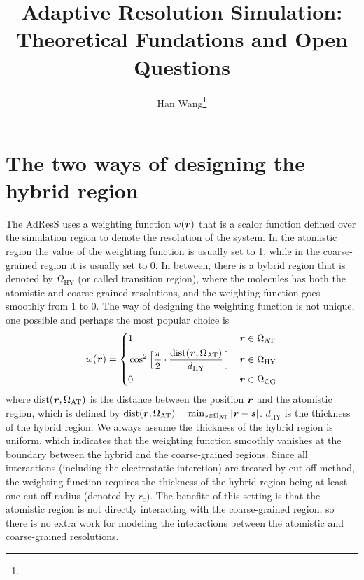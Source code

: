 \documentclass[epjST]{svjour}
\newcommand{\vect}[1]{\textbf{\textit{#1}}}
\newcommand{\dist}[0]{\textrm {dist}}
\newcommand{\AT}[0]{\textrm{AT}}
\newcommand{\HY}[0]{\textrm{HY}}
\newcommand{\CG}[0]{\textrm{CG}}
\begin{document}
%
\title{Adaptive Resolution Simulation: Theoretical Fundations and Open Questions}
\author{Han Wang\fnmsep\thanks{}}
%
%
%
\maketitle
%


\section{The two ways  of designing the hybrid region}

The AdResS uses a weighting function $w(\vect r)$ that is a scalor
function defined over the simulation region to denote the resolution
of the system. In the atomistic region the value of the
weighting function is usually set to 1, while in the coarse-grained
region it is usually set to 0. In between, there is a bybrid region
that is denoted by $\Omega_\HY$
(or called transition region), where the molecules
has both the atomistic and coarse-grained resolutions, and the weighting function
goes smoothly from 1 to 0. The way of designing the weighting function
is not unique, one possible and perhaps the most popular choice is
\begin{equation}\label{eqn:old-w}
  w(\vect r) =
  \left\{
    \begin{alignedat}{3}
      &1 &\quad& \vect r \in \Omega_\AT\\
      &\cos^2\Big[\frac{\pi}{2 } \cdot \frac{\dist(\vect r, \Omega_\AT)}{d_\HY}\,\Big] && \vect r \in\Omega_\HY \\
      &0 &    & \vect r \in \Omega_\CG 
    \end{alignedat}
  \right.
\end{equation}
where $\dist(\vect r, \Omega_\AT)$ is the distance between the
position $\vect r$ and the atomistic region, which is defined
by $\dist(\vect r, \Omega_\AT) = \min_{\vect s\in\Omega_\AT} \vert
\vect r - \vect s \vert$.  $d_\HY$ is the thickness of the hybrid
region. We always assume the thickness of the hybrid region is
uniform, which indicates that the weighting function smoothly vanishes
at the boundary between the hybrid and the coarse-grained regions.
Since all interactions (including the electrostatic interction) are treated
by cut-off method, the weighting function requires the thickness of
the hybrid region being at least one cut-off radius (denoted by $r_c$). 
The benefite of this setting is that the atomistic
region is not directly interacting with the coarse-grained region,
so there is no extra work for modeling the interactions between the atomistic
and coarse-grained resolutions.
\end{document}
